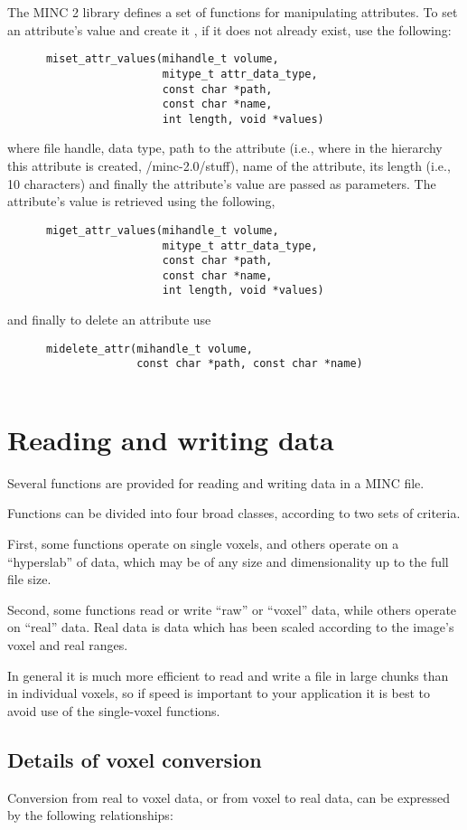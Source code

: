 \documentclass{article}
\begin{document}
The MINC 2 library defines a set of functions for manipulating attributes. To set 
an attribute's value and
create it , if it does not already exist, use the following:
\begin{verbatim}
      miset_attr_values(mihandle_t volume, 
                        mitype_t attr_data_type,
                        const char *path, 
                        const char *name,
                        int length, void *values)
\end{verbatim}
where file handle, data type, path to the attribute (i.e., where in the hierarchy this
attribute is created, /minc-2.0/stuff), name of the attribute, its length (i.e., 10 
characters) and finally the attribute's value are passed as parameters. 
The attribute's value is retrieved using the following,
\begin{verbatim}
      miget_attr_values(mihandle_t volume,
                        mitype_t attr_data_type,
                        const char *path, 
                        const char *name,
                        int length, void *values)
\end{verbatim}
and finally to delete an attribute use
\begin{verbatim}
      midelete_attr(mihandle_t volume, 
                    const char *path, const char *name)
                       
\end{verbatim}
\section{Reading and writing data}
Several functions are provided for reading and writing data in a MINC 
file.

Functions can be divided into four broad classes, according to two 
sets of criteria.

First, some functions operate on single voxels, and others operate on
a ``hyperslab'' of data, which may be of any size and dimensionality up to the 
full file size.

Second, some functions read or write ``raw'' or ``voxel'' data, while others
operate on ``real'' data.  Real data is data which has been scaled according
to the image's voxel and real ranges.

In general it is much more efficient to read and write a file in large
chunks than in individual voxels, so if speed is important to your
application it is best to avoid use of the single-voxel functions.

\subsection{Details of voxel conversion}
Conversion from real to voxel data, or from voxel to real data, can
be expressed by the following relationships:
\end{document}
